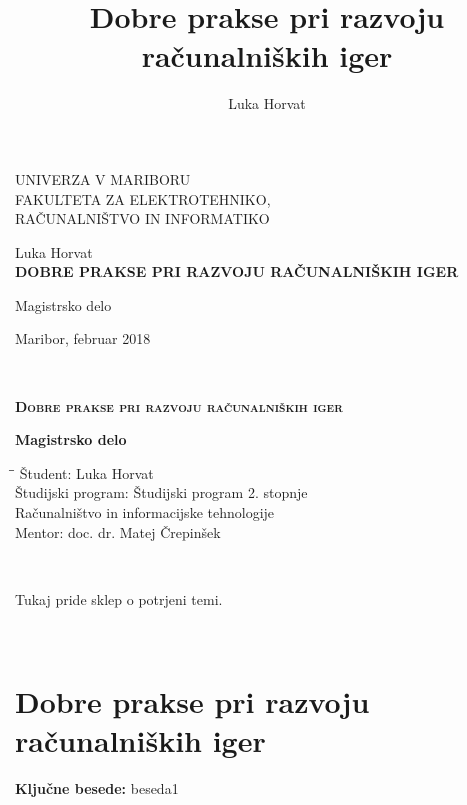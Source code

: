 \documentclass[12pt,a4paper,twoside]{book}
\author{Luka Horvat}
\title{Dobre prakse pri razvoju računalniških iger}
\begin{document}
	
\thispagestyle{empty} 
\begin{center}
{\large 
UNIVERZA V MARIBORU\\
FAKULTETA ZA ELEKTROTEHNIKO,\\
RAČUNALNIŠTVO IN INFORMATIKO\\
}

\vspace{\fill}
{\LARGE Luka Horvat}\\

\vspace{1cm}
\textsc{\textbf{\LARGE
		DOBRE PRAKSE PRI RAZVOJU RAČUNALNIŠKIH IGER\\}}

\vspace{1cm}
{\LARGE Magistrsko delo}

\vfill
{\Large Maribor, februar 2018}
\newpage
\end{center}

\ \thispagestyle{empty}
\newpage

\thispagestyle{empty} 
\begin{center}	
\vspace*{\fill}
\textsc{\textbf{\LARGE
		Dobre prakse pri razvoju računalniških iger\\
	}}
{\large\textbf{Magistrsko delo\\}
	
}
\vspace{\fill}
\begin{tabbing}
\hspace*{4cm}\=\hspace*{3cm}\= \kill
Študent: \> Luka Horvat\\
Študijski program: \> Študijski program 2. stopnje\\
\>Računalništvo in informacijske tehnologije\\
Mentor: \> doc. dr. Matej Črepinšek
\end{tabbing}
\end{center}
\newpage

\ \thispagestyle{empty}
\newpage

\thispagestyle{empty}
Tukaj pride sklep o potrjeni temi.
\newpage

\ \thispagestyle{empty}
\newpage

\chapter*{Dobre prakse pri razvoju računalniških iger}
\thispagestyle{fancy}
\setcounter{page}{1}
\textbf{Ključne besede:} beseda1
\end{document}
